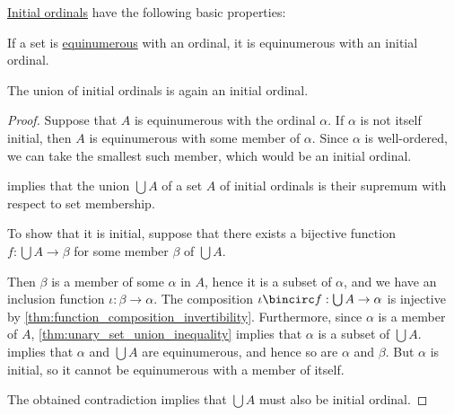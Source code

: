 \begin{proposition}\label{thm:def:initial_ordinal}
  \hyperref[def:initial_ordinal]{Initial ordinals} have the following basic properties:
  \begin{thmenum}
     If a set is \hyperref[def:equinumerosity]{equinumerous} with an ordinal, it is equinumerous with an initial ordinal.

     The union of initial ordinals is again an initial ordinal.
  \end{thmenum}
\end{proposition}
\begin{proof}
   Suppose that \( A \) is equinumerous with the ordinal \( \alpha \). If \( \alpha \) is not itself initial, then \( A \) is equinumerous with some member of \( \alpha \). Since \( \alpha \) is well-ordered, we can take the smallest such member, which would be an initial ordinal.

    implies that the union \( \bigcup A \) of a set \( A \) of initial ordinals is their supremum with respect to set membership.

  To show that it is initial, suppose that there exists a bijective function \( f: \bigcup A \to \beta \) for some member \( \beta \) of \( \bigcup A \).

  Then \( \beta \) is a member of some \( \alpha \) in \( A \), hence it is a subset of \( \alpha \), and we have an inclusion function \( \iota: \beta \to \alpha \). The composition \( \iota \bincirc f: \bigcup A \to \alpha \) is injective by \cref{thm:function_composition_invertibility}. Furthermore, since \( \alpha \) is a member of \( A \), \cref{thm:unary_set_union_inequality} implies that \( \alpha \) is a subset of \( \bigcup A \).  implies that \( \alpha \) and \( \bigcup A \) are equinumerous, and hence so are \( \alpha \) and \( \beta \). But \( \alpha \) is initial, so it cannot be equinumerous with a member of itself.

  The obtained contradiction implies that \( \bigcup A \) must also be initial ordinal.
\end{proof}

